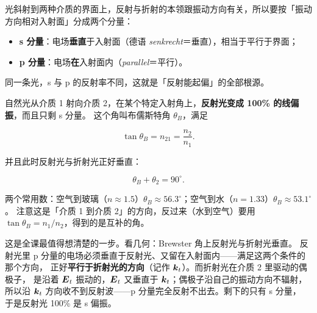 \documentclass[11pt]{ctexart}
\let\subhdrtheme\subhdr
\renewcommand{\subhdr}[1]{\needspace{4\baselineskip}\subhdrtheme{#1}}
\let\hdrorig\hdr
\renewcommand{\hdr}[2]{\needspace{8\baselineskip}\hdrorig{#1}{#2}}
\begin{document}


光斜射到两种介质的界面上，反射与折射的本领跟振动方向有关，所以要按「振动方向相对入射面」分成两个分量：

\begin{itemize}
\item \textbf{s 分量}：电场\textbf{垂直}于入射面（德语 \emph{senkrecht}＝垂直），相当于平行于界面；
\item \textbf{p 分量}：电场\textbf{在}入射面内（\emph{parallel}＝平行）。
\end{itemize}

同一条光，s 与 p 的反射率不同，这就是「反射能起偏」的全部根源。


自然光从介质 1 射向介质 2，在某个特定入射角上，\textbf{反射光变成 100\% 的线偏振}，而且只剩 s 分量。
这个角叫布儒斯特角 $\theta_B$，满足

\[
\tan\theta_B=n_{21}=\frac{n_2}{n_1}.
\]

并且此时反射光与折射光正好垂直：

\[
\theta_B+\theta_2=90^\circ .
\]

两个常用数：空气到玻璃（$n\approx1.5$）$\theta_B\approx56.3^\circ$；空气到水（$n=1.33$）$\theta_B\approx53.1^\circ$。
注意这是「介质 1 到介质 2」的方向，反过来（水到空气）要用 $\tan\theta_B=n_1/n_2$，得到的是互补的角。


这是全课最值得想清楚的一步。看几何：Brewster 角上反射光与折射光垂直。
反射光里 p 分量的电场必须垂直于反射光、又留在入射面内——满足这两个条件的那个方向，
正好\textbf{平行于折射光的方向}（记作 $\boldsymbol{k}_t$）。而折射光在介质 2 里驱动的偶极子，
是沿着 $\boldsymbol{E}_t$ 振动的，$\boldsymbol{E}_t$ 又垂直于 $\boldsymbol{k}_t$；偶极子沿自己的振动方向不辐射，
所以沿 $\boldsymbol{k}_t$ 方向收不到反射波——p 分量完全反射不出去。剩下的只有 s 分量，
于是反射光 100\% 是 s 偏振。
\end{document}
